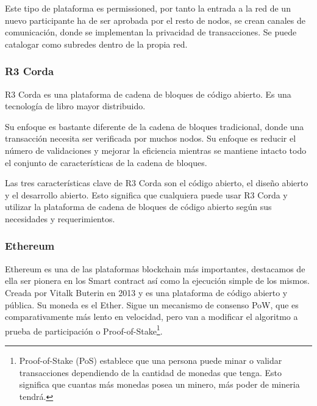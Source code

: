 \noindent Este tipo de plataforma es permissioned, por tanto la entrada a la red de un nuevo participante ha de ser
aprobada por el resto de nodos, se crean canales de comunicación, donde se implementan la privacidad de transacciones.
Se puede catalogar como subredes dentro de la propia red.

\subsubsection*{R3 Corda}

R3 Corda es una plataforma de cadena de bloques de código abierto. Es una tecnología de libro mayor distribuido.

\vspace{5mm}

\noindent Su enfoque es bastante diferente de la cadena de bloques tradicional, donde una transacción necesita ser 
verificada por muchos nodos. Su enfoque es reducir el número de validaciones y mejorar la eficiencia mientras se 
mantiene intacto todo el conjunto de características de la cadena de bloques.

\vspace{5mm}

\noindent Las tres características clave de R3 Corda son el código abierto, el diseño abierto y el desarrollo abierto. 
Esto significa que cualquiera puede usar R3 Corda y utilizar la plataforma de cadena de bloques de código abierto 
según sus necesidades y requerimientos. 

\subsubsection*{Ethereum}

Ethereum es una de las plataformas blockchain más importantes, destacamos de ella ser pionera en los Smart contract así 
como la ejecución simple de los mismos. Creada por Vitalk Buterin en 2013 y es una plataforma de código abierto y 
pública. Su moneda es el Ether. Sigue un mecanismo de consenso PoW, que es comparativamente más lento en velocidad, 
pero van a modificar el algoritmo a prueba de participación o Proof-of-Stake\footnote{Proof-of-Stake (PoS) establece 
que una persona puede minar o validar transacciones dependiendo de la cantidad de monedas que tenga. Esto significa que 
cuantas más monedas posea un minero, más poder de mineria tendrá.\label{fnlabel}}.

\vspace{5mm}

